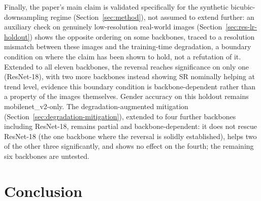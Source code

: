 \documentclass[pdflatex,sn-vancouver-num]{sn-jnl}
\begin{document}
Finally, the paper's main claim is validated specifically for the synthetic bicubic-downsampling regime (Section~\ref{sec:method}), not assumed to extend further: an auxiliary check on genuinely low-resolution real-world images (Section~\ref{sec:res-lr-holdout}) shows the opposite ordering on some backbones, traced to a resolution mismatch between these images and the training-time degradation, a boundary condition on where the claim has been shown to hold, not a refutation of it. Extended to all eleven backbones, the reversal reaches significance on only one (ResNet-18), with two more backbones instead showing SR nominally helping at trend level, evidence this boundary condition is backbone-dependent rather than a property of the images themselves. Gender accuracy on this holdout remains mobilenet\_v2-only. The degradation-augmented mitigation (Section~\ref{sec:degradation-mitigation}), extended to four further backbones including ResNet-18, remains partial and backbone-dependent: it does not rescue ResNet-18 (the one backbone where the reversal is solidly established), helps two of the other three significantly, and shows no effect on the fourth; the remaining six backbones are untested.

\section{Conclusion}
\label{sec:conclusion}
\end{document}
